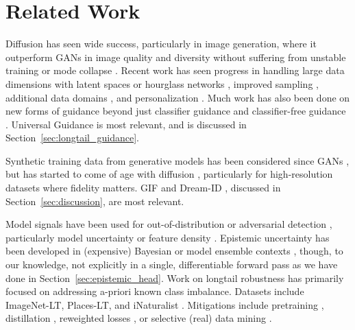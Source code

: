 \section{Related Work}
Diffusion has seen wide success, particularly in image generation, where it outperform GANs in image quality and diversity without suffering from unstable training or mode collapse \cite{dhariwal2021diffusion}. Recent work has seen progress in handling large data dimensions with latent spaces \cite{chen2025pixart, podell2023sdxl, rombach2022high} or hourglass networks \cite{crowson2024scalable}, improved sampling \cite{lu2022dpm, karras2022elucidating, ho2020denoising, song2020denoising}, additional data domains \cite{ran2024towards, pronovost2023scenario, zhong2023language}, and personalization \cite{ruiz2023dreambooth, kumari2023multi}. Much work has also been done on new forms of guidance \cite{wallace2023edict, yu2023freedom, wallace2023end, zhang2023adding} beyond just classifier guidance and classifier-free guidance \cite{dhariwal2021diffusion, ho2022classifier}. Universal Guidance \cite{bansal2023universal} is most relevant, and is discussed in Section~\ref{sec:longtail_guidance}. 

Synthetic training data from generative models has been considered since GANs \cite{li2022bigdatasetgan}, but has started to come of age with diffusion \cite{azizi2023synthetic, zhou2023training}, particularly for high-resolution datasets where fidelity matters. GIF \cite{zhang2023expanding} and Dream-ID \cite{du2024dream}, discussed in Section~\ref{sec:discussion}, are most relevant.

Model signals have been used for out-of-distribution or adversarial detection \cite{huang2021importance, hsu2020generalized, cohen2020detecting}, particularly model uncertainty \cite{van2020uncertainty} or feature density \cite{lee2018simple}. Epistemic uncertainty has been developed in (expensive) Bayesian \cite{gal2016dropout} or model ensemble contexts \cite{liu2019accurate, depeweg2018decomposition, wilson2020bayesian, lakshminarayanan2017simple}, though, to our knowledge, not explicitly in a single, differentiable forward pass as we have done in Section~\ref{sec:epistemic_head}. Work on longtail robustness has primarily focused on addressing a-priori known class imbalance. Datasets include ImageNet-LT, Places-LT, \cite{liu2019large} and iNaturalist \cite{van2018inaturalist}. Mitigations include pretraining \cite{he2022masked, bao2021beit}, distillation \cite{xiang2020learning}, reweighted losses \cite{xu2023learning, ross2017focal}, or selective (real) data mining \cite{jiang2022improving}.